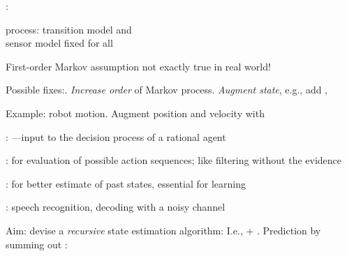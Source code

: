 \documentclass{article}
\begin{document}
\begin{huge}
: 

 process: transition model  and\\
sensor model  fixed for all 




\vspace*{0.2in}

\textwidth
{}

First-order Markov assumption not exactly true in real world!

Possible fixes:. \emph{Increase order} of Markov process. \emph{Augment state}, e.g., add , 

Example: robot motion. \al
  Augment position and velocity with 



: \al
  ---input to the decision process of a rational agent

:  for \al
  evaluation of possible action sequences;\al
  like filtering without the evidence

:  for \al
  better estimate of past states, essential for learning

: \al
  speech recognition, decoding with a noisy channel


Aim: devise a \emph{recursive} state estimation algorithm:
\mat{\[
  \pv(\X_{t+1}|\e_{1:t+1}) = f(\e_{t+1},\pv(\X_t|\e_{1:t}))
\]}
I.e.,  + . Prediction by summing out :


\end{huge}
\end{document}
